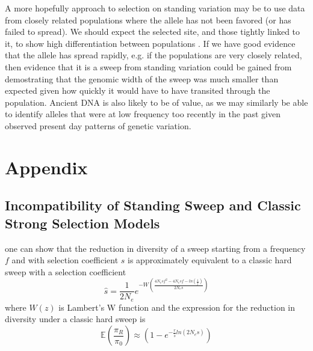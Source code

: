 \documentclass[a4paper,10pt]{article}
\begin{document}
A more hopefully approach to selection on standing variation may be to use data from closely related populations where the allele has not been favored (or has failed to spread). We should expect the selected site, and those tightly linked to it, to show high differentiation between populations \citep{Innan:2008ii}. If we have good evidence that the allele has spread rapidly, e.g. if the populations are very closely related, then evidence that it is a sweep from standing variation could be gained from demostrating that the genomic width of the sweep was much smaller than expected given how quickly it would have to have transited through the population. Ancient DNA is also likely to be of value, as we may similarly be able to identify alleles that were at low frequency too recently in the past given observed present day patterns of genetic variation.


\section{Appendix}

\subsection{Incompatibility of Standing Sweep and Classic Strong Selection Models}

one can show that the reduction in diversity of a sweep starting from a frequency $f$ and with selection coefficient $s$ is approximately equivalent to a classic hard sweep with a selection coefficient
\begin{equation}
	\hat{s} = \frac{1}{2N_e} e^{-W\left(\frac{4N_e sf^2 - 4N_e s f  - ln \left( \frac{1}{f} \right)}{2N_es}\right)}
\end{equation}
where $W\left(z\right)$ is Lambert's W function and the expression for the reduction in diversity under a classic hard sweep is
\begin{equation}
	\mathbb{E}\left(\frac{\pi_R}{\pi_0}\right) \approx \left(1- e^{-\frac{r}{\hat{s}}ln\left(2N_e \hat{s}\right)} \right)
\end{equation}
\citep{Pennings2006}
\end{document}
